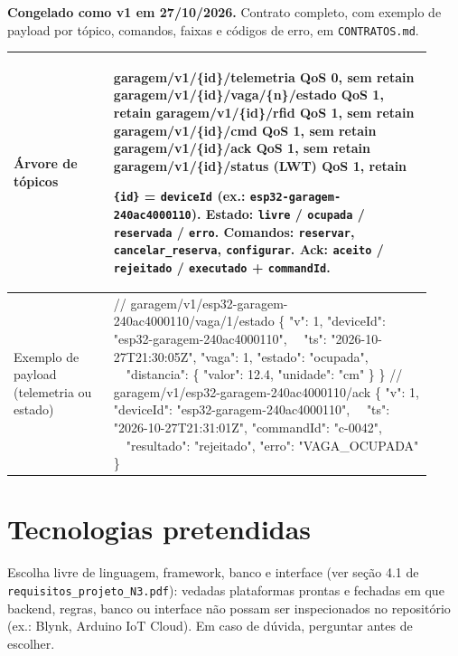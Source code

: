 \documentclass[11pt,a4paper]{article}
\newcommand{\cod}[1]{\texttt{#1}}
\begin{document}
\textbf{Congelado como v1 em 27/10/2026.} Contrato completo, com exemplo de payload por tópico, comandos, faixas e códigos de erro, em \cod{CONTRATOS.md}.

\begin{longtable}{|p{0.22\linewidth}|p{0.70\linewidth}|}
\hline
Árvore de tópicos & {\small \ttfamily\raggedright
garagem/v1/\{id\}/telemetria \hfill QoS 0, sem retain\newline
garagem/v1/\{id\}/vaga/\{n\}/estado \hfill QoS 1, retain\newline
garagem/v1/\{id\}/rfid \hfill QoS 1, sem retain\newline
garagem/v1/\{id\}/cmd \hfill QoS 1, sem retain\newline
garagem/v1/\{id\}/ack \hfill QoS 1, sem retain\newline
garagem/v1/\{id\}/status (LWT) \hfill QoS 1, retain}
\smallskip
{\small \cod{\{id\}} = \cod{deviceId} (ex.: \cod{esp32-garagem-240ac4000110}). Estado: \cod{livre} / \cod{ocupada} / \cod{reservada} / \cod{erro}. Comandos: \cod{reservar}, \cod{cancelar\_reserva}, \cod{configurar}. Ack: \cod{aceito} / \cod{rejeitado} / \cod{executado} + \cod{commandId}.} \\ \hline
Exemplo de payload (telemetria ou estado) & {\small \ttfamily
// garagem/v1/esp32-garagem-240ac4000110/vaga/1/estado\newline
\{ "v": 1, "deviceId": "esp32-garagem-240ac4000110",\newline
\ \ "ts": "2026-10-27T21:30:05Z", "vaga": 1, "estado": "ocupada",\newline
\ \ "distancia": \{ "valor": 12.4, "unidade": "cm" \} \}\newline\vspace{0.4em}
// garagem/v1/esp32-garagem-240ac4000110/ack\newline
\{ "v": 1, "deviceId": "esp32-garagem-240ac4000110",\newline
\ \ "ts": "2026-10-27T21:31:01Z", "commandId": "c-0042",\newline
\ \ "resultado": "rejeitado", "erro": "VAGA\_OCUPADA" \}} \\ \hline
\end{longtable}

\section{Tecnologias pretendidas}

Escolha livre de linguagem, framework, banco e interface (ver seção 4.1 de \cod{requisitos\_projeto\_N3.pdf}):
vedadas plataformas prontas e fechadas em que backend, regras, banco ou interface não
possam ser inspecionados no repositório (ex.: Blynk, Arduino IoT Cloud). Em caso de
dúvida, perguntar antes de escolher.
\end{document}
